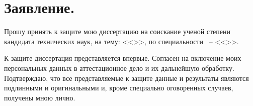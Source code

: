 



\hfill\parbox{8.5cm}{
	\raggedleft{\dcHeadRegalia\ \dcToHeadFIO}		
	\raggedleft{\myJob}		
	\raggedleft{\thesisAuthorLastNameFrom}	


	}
\vspace{0.5cm}



\section{Заявление.}

Прошу принять к защите мою диссертацию на соискание ученой степени кандидата технических наук, на тему: <<\thesisTitle>>, по специальности 
\thesisSpecialtyNumber\ -- <<\thesisSpecialtyTitle>>. 

К защите диссертация представляется впервые. Согласен на включение моих персональных данных в аттестационное дело и их дальнейшую обработку. Подтверждаю, что все представляемые к защите данные и результаты являются подлинными и оригинальными и, кроме специально оговоренных случаев, получены мною лично.


\clearpage